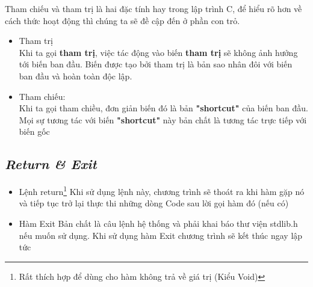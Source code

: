 \documentclass[12pt,a4paper]{article}
\begin{document}
Tham chiếu và tham trị là hai đặc tính hay trong lập trình C, để hiểu rõ hơn về cách thức hoạt động thì chúng ta sẽ đề cập đến ở phần con trỏ.
\begin{itemize}
	\item Tham trị\\
Khi ta gọi \textbf{tham trị}, việc tác động vào biến \textbf{tham trị} sẽ không ảnh hưởng tới biến ban đầu. Biến được tạo bởi tham trị là bản sao nhân đôi với biến ban đầu và hoàn toàn độc lập.
	\item Tham chiếu:\\
Khi ta gọi tham chiều, đơn giản biến đó là bản \textbf{"shortcut"} của biến ban đầu. Mọi sự tương tác với biến \textbf{"shortcut"} này bản chất là tương tác trực tiếp với biến gốc
\end{itemize}
\begin{center}
	\subsection*{\textit{Return \& Exit}}
\end{center}
\begin{itemize}
	\item Lệnh return\footnote{ Rất thích hợp để dùng cho hàm không trả về giá trị (Kiểu Void)}
Khi sử dụng lệnh này, chương trình sẽ thoát ra khi hàm gặp nó và tiếp tục trở lại thực thi những dòng Code sau lời gọi hàm đó (nếu có)
	\item Hàm Exit
Bản chất là câu lệnh hệ thống và phải khai báo thư viện stdlib.h nếu muốn sử dụng. Khi sử dụng hàm Exit chương trình sẽ kết thúc ngay lập tức
\end{itemize}
\end{document}
